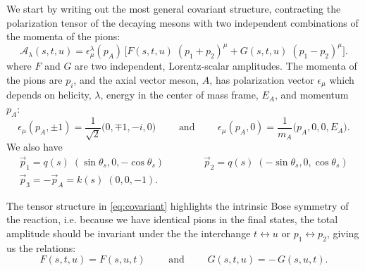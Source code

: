 \documentclass[10pt, aps,prd,amsmath,amssymb,superscriptaddress,onecolumn,
nofootinbib,showpacs,preprintnumbers]{revtex4-1}
\begin{document}
   We start by writing out the most general covariant structure, contracting the polarization tensor of the decaying mesons with two independent combinations of the momenta of the pions:
   \begin{equation}
     \label{eq:covariant}
     \mathcal{A}_\lambda(s,t,u) = \epsilon_\mu^\lambda(p_A) \, \bigg[ F(s,t,u) \; (p_1 + p_2)^\mu + G(s,t,u) \;  (p_1 - p_2)^\mu \bigg].
     \end{equation}
 where \(F\) and \(G\) are two independent, Lorentz-scalar amplitudes. The momenta of the pions are \(p_i\), and the axial vector meson, \(A\), has polarization vector \(\epsilon_\mu\) which depends on helicity, \(\lambda\), energy in the center of mass frame, \(E_A\), and momentum \(p_A\):
   \begin{equation}
     \label{eq:polarization}
     \epsilon_\mu(p_A, \pm1) = \frac{1}{\sqrt{2}} \big( 0, \mp 1, - i, 0 \big) \qquad \text{ and } \qquad \epsilon_\mu(p_A, 0) = \frac{1}{m_A} \big( p_A, 0, 0, E_A \big).
     \end{equation}
 We also have
   \begin{gather}
     \vec{p}_1 = q(s) \; (\sin \theta_s, 0,  -\cos \theta_s) \qquad \qquad \vec{p}_2 = q(s) \; (-\sin \theta_s, 0 , \cos \theta_s ) \\
     \vec{p}_3 = - \vec{p}_A = k(s) \; (0,0,-1). \nonumber
   \end{gather}

 The  tensor structure in \cref{eq:covariant} highlights the intrinsic Bose symmetry of the reaction, i.e. because we have identical pions in the final states, the total amplitude should be invariant under the the interchange \(t \leftrightarrow u \) or \(p_1 \leftrightarrow p_2\), giving us the relations:
   \begin{equation}
     F(s,t,u) = F(s,u,t) \qquad \text{ and } \qquad G(s,t,u) = - \, G(s,u,t).
   \end{equation}
\end{document}
